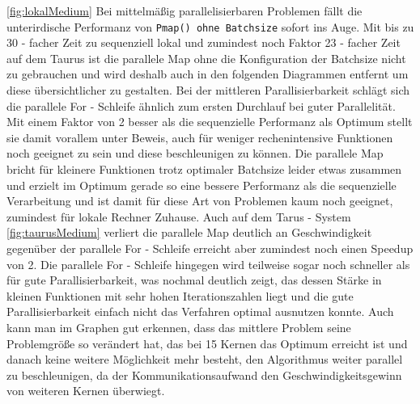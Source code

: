 \documentclass[proseminar,german,utf8]{zihpub}
\begin{document}
\newpage 
\ref{fig:lokalMedium} Bei mittelmäßig parallelisierbaren Problemen fällt die unterirdische Performanz von \verb|Pmap() ohne Batchsize| sofort ins Auge. Mit bis zu 30 - facher Zeit zu sequenziell lokal und zumindest noch Faktor 23 - facher Zeit auf dem Taurus ist die parallele Map ohne die Konfiguration der Batchsize nicht zu gebrauchen und wird deshalb auch in den folgenden Diagrammen entfernt um diese übersichtlicher zu gestalten. Bei der mittleren Parallisierbarkeit schlägt sich die parallele For - Schleife ähnlich zum ersten Durchlauf bei guter Parallelität. Mit einem Faktor von 2 besser als die sequenzielle Performanz als Optimum stellt sie damit vorallem unter Beweis, auch für weniger rechenintensive Funktionen noch geeignet zu sein und diese beschleunigen zu können. Die parallele Map bricht für kleinere Funktionen trotz optimaler Batchsize leider etwas zusammen und erzielt im Optimum gerade so eine bessere Performanz als die sequenzielle Verarbeitung und ist damit für diese Art von Problemen kaum noch geeignet, zumindest für lokale Rechner Zuhause. Auch auf dem Tarus - System \ref{fig:taurusMedium} verliert die parallele Map deutlich an Geschwindigkeit gegenüber der parallele For - Schleife erreicht aber zumindest noch einen Speedup von 2. Die parallele For - Schleife hingegen wird teilweise sogar noch schneller als für gute Parallisierbarkeit, was nochmal deutlich zeigt, das dessen Stärke in kleinen Funktionen mit sehr hohen Iterationszahlen liegt und die gute Parallisierbarkeit einfach nicht das Verfahren optimal ausnutzen konnte. Auch kann man im Graphen gut erkennen, dass das mittlere Problem seine Problemgröße so verändert hat, das bei 15 Kernen das Optimum erreicht ist und danach keine weitere Möglichkeit mehr besteht, den Algorithmus weiter parallel zu beschleunigen, da der Kommunikationsaufwand den Geschwindigkeitsgewinn von weiteren Kernen überwiegt. 
\end{document}
